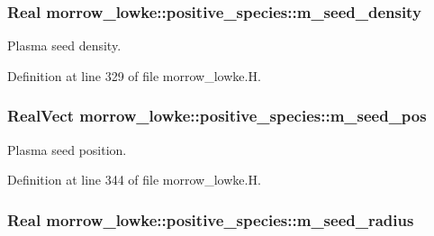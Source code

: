 \subsubsection[{\texorpdfstring{m\+\_\+seed\+\_\+density}{m_seed_density}}]{\setlength{\rightskip}{0pt plus 5cm}Real morrow\+\_\+lowke\+::positive\+\_\+species\+::m\+\_\+seed\+\_\+density}\hypertarget{classmorrow__lowke_1_1positive__species_adc9b6b6a2d33e0d2f967d4751d48922f}{}\label{classmorrow__lowke_1_1positive__species_adc9b6b6a2d33e0d2f967d4751d48922f}


Plasma seed density. 



Definition at line 329 of file morrow\+\_\+lowke.\+H.

\subsubsection[{\texorpdfstring{m\+\_\+seed\+\_\+pos}{m_seed_pos}}]{\setlength{\rightskip}{0pt plus 5cm}Real\+Vect morrow\+\_\+lowke\+::positive\+\_\+species\+::m\+\_\+seed\+\_\+pos}\hypertarget{classmorrow__lowke_1_1positive__species_a4f84551ff5e9df06e3c2111f4e6a87b2}{}\label{classmorrow__lowke_1_1positive__species_a4f84551ff5e9df06e3c2111f4e6a87b2}


Plasma seed position. 



Definition at line 344 of file morrow\+\_\+lowke.\+H.

\subsubsection[{\texorpdfstring{m\+\_\+seed\+\_\+radius}{m_seed_radius}}]{\setlength{\rightskip}{0pt plus 5cm}Real morrow\+\_\+lowke\+::positive\+\_\+species\+::m\+\_\+seed\+\_\+radius}\hypertarget{classmorrow__lowke_1_1positive__species_a56ada2fc59290046206495bd4ae01a71}{}\label{classmorrow__lowke_1_1positive__species_a56ada2fc59290046206495bd4ae01a71}


